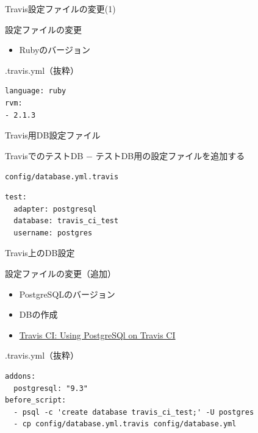 \documentclass[t, aspectratio=169]{beamer}
\begin{document}
\begin{frame}[fragile,label=sec-7-3-4]{Travis設定ファイルの変更(1)}
 \begin{block}{設定ファイルの変更}
\begin{itemize}
\item Rubyのバージョン
\end{itemize}
\end{block}

\begin{block}{.travis.yml（抜粋）}
\begin{verbatim}
language: ruby
rvm:
- 2.1.3
\end{verbatim}
\end{block}
\end{frame}

\begin{frame}[fragile,label=sec-7-3-5]{Travis用DB設定ファイル}
 \begin{block}{TravisでのテストDB}
− テストDB用の設定ファイルを追加する
\end{block}

\begin{block}{\texttt{config/database.yml.travis}}
\begin{verbatim}
test:
  adapter: postgresql
  database: travis_ci_test
  username: postgres
\end{verbatim}
\end{block}
\end{frame}
\begin{frame}[fragile,label=sec-7-3-6]{Travis上のDB設定}
 \begin{block}{設定ファイルの変更（追加）}
\begin{itemize}
\item PostgreSQLのバージョン
\item DBの作成
\item \href{http://docs.travis-ci.com/user/using-postgresql/}{Travis CI: Using PostgreSQl on Travis CI}
\end{itemize}
\end{block}
\begin{block}{.travis.yml（抜粋）}
\begin{verbatim}
addons:
  postgresql: "9.3"
before_script:
  - psql -c 'create database travis_ci_test;' -U postgres
  - cp config/database.yml.travis config/database.yml
\end{verbatim}
\end{block}
\end{frame}
\end{document}
